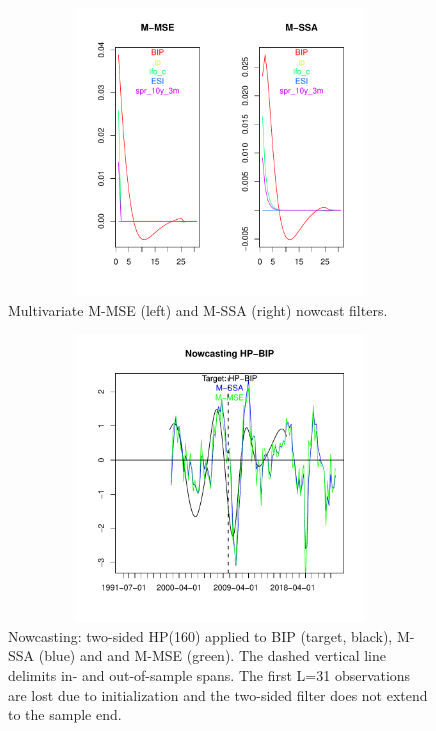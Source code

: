\documentclass[a4paper]{article}
\begin{document}
\begin{figure}[H]\begin{center}\includegraphics[height=3in, width=4.5in]{./Figures/bk_gammak.pdf}\caption{Multivariate M-MSE (left) and M-SSA  (right) nowcast filters.\label{bk_gammak}}\end{center}\end{figure}\begin{figure}[H]\begin{center}\includegraphics[height=3in, width=4.5in]{./Figures/mssa_msse_now.pdf}\caption{Nowcasting: two-sided HP(160) applied to BIP (target, black),  M-SSA (blue) and and M-MSE (green). The dashed vertical line delimits in- and out-of-sample spans. The first L=31 observations are lost due to initialization and the two-sided filter does not extend to the sample end.\label{mssa_msse_now}}\end{center}\end{figure}%
\end{document}

